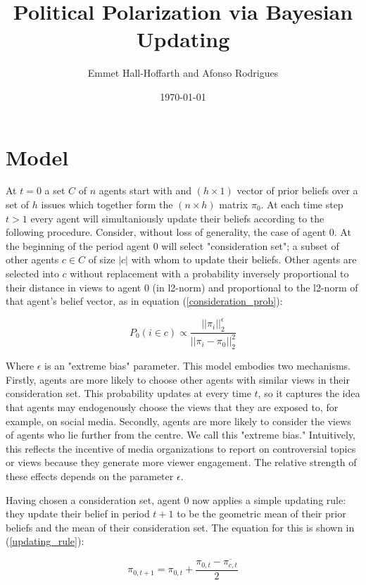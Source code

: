 \documentclass{article}
\title{Political Polarization via Bayesian Updating}
\author{Emmet Hall-Hoffarth and Afonso Rodrigues}
\date{\today}
\begin{document}
\maketitle
    
\section{Model}

At $t=0$ a set $C$ of $n$ agents start with and $(h \times 1)$ vector of prior beliefs over a set of $h$ issues which together form the $(n \times h)$ matrix $\pi_0$. At each time step $t > 1$ every agent will simultaniously update their beliefs according to the following procedure. Consider, without loss of generality, the case of agent 0. At the beginning of the period agent 0 will select "consideration set"; a subset of other agents $c \in C$ of size $|c|$ with whom to update their beliefs. Other agents are selected into $c$ without replacement with a probability inversely proportional to their distance in views to agent 0 (in l2-norm) and proportional to the l2-norm of that agent's belief vector, as in equation (\ref{consideration_prob}):

\begin{equation}
    P_0(i \in c) \propto \frac{{||\pi_i||}_2^\epsilon}{{||\pi_i - \pi_0||}_2^2}
    \label{consideration_prob}
\end{equation}

Where $\epsilon$ is an "extreme bias" parameter. This model embodies two mechanisms. Firstly, agents are more likely to choose other agents with similar views in their consideration set. This probability updates at every time $t$, so it captures the idea that agents may endogenously choose the views that they are exposed to, for example, on social media. Secondly, agents are more likely to consider the views of agents who lie further from the centre. We call this "extreme bias." Intuitively, this reflects the incentive of media organizations to report on controversial topics or views because they generate more viewer engagement. The relative strength of these effects depends on the parameter $\epsilon$.

Having chosen a consideration set, agent 0 now applies a simple updating rule: they update their belief in period $t+1$ to be the geometric mean of their prior beliefs and the mean of their consideration set. The equation for this is shown in (\ref{updating_rule}):

\begin{equation}
    \pi_{0, t+1} = \pi_{0, t} + \frac{\pi_{0, t} - \overline{\pi_{c, t}}}{2}
    \label{updating_rule}
\end{equation}
\end{document}
